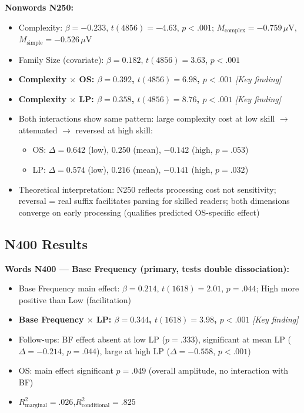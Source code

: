 \documentclass[11pt, a4paper]{article}
\begin{document}
\textbf{Nonwords N250:}
\begin{itemize}[leftmargin=1.5em]
  \item Complexity: $\beta = -0.233$, $t(4856) = -4.63$, $p < .001$;
        $M_\text{complex} = -0.759\,\mu$V, $M_\text{simple} = -0.526\,\mu$V
  \item Family Size (covariate): $\beta = 0.182$, $t(4856) = 3.63$, $p < .001$
  \item \textbf{Complexity $\times$ OS: $\beta = 0.392$, $t(4856) = 6.98$, $p < .001$} \textit{[Key finding]}
  \item \textbf{Complexity $\times$ LP: $\beta = 0.358$, $t(4856) = 8.76$, $p < .001$} \textit{[Key finding]}
  \item Both interactions show same pattern: large complexity cost at low skill $\to$ attenuated $\to$ reversed at high skill:
  \begin{itemize}
    \item OS: $\Delta = 0.642$ (low), $0.250$ (mean), $-0.142$ (high, $p = .053$)
    \item LP: $\Delta = 0.574$ (low), $0.216$ (mean), $-0.141$ (high, $p = .032$)
  \end{itemize}
  \item Theoretical interpretation: N250 reflects processing cost not sensitivity; reversal = real suffix facilitates parsing for skilled readers; both dimensions converge on early processing (qualifies predicted OS-specific effect)
\end{itemize}

\subsection{N400 Results}

\textbf{Words N400 — Base Frequency (primary, tests double dissociation):}
\begin{itemize}[leftmargin=1.5em]
  \item Base Frequency main effect: $\beta = 0.214$, $t(1618) = 2.01$, $p = .044$; High more positive than Low (facilitation)
  \item \textbf{Base Frequency $\times$ LP: $\beta = 0.344$, $t(1618) = 3.98$, $p < .001$} \textit{[Key finding]}
  \item Follow-ups: BF effect absent at low LP ($p = .333$), significant at mean LP ($\Delta = -0.214$, $p = .044$), large at high LP ($\Delta = -0.558$, $p < .001$)
  \item OS: main effect significant $p = .049$ (overall amplitude, no interaction with BF)
  \item $R^2_\text{marginal} = .026$,\quad $R^2_\text{conditional} = .825$
\end{itemize}
\end{document}
